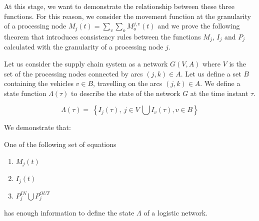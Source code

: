 At this stage, we want to demonstrate the relationship between these three functions. For this reason, we consider the movement function at the granularity of a processing node $M_j(t)=\sum_{v}\sum_{o}{M_o^{j,v}(t)}$  and we prove the following theorem that introduces consistency rules between the functions $M_j$, $I_j$ and $P_j$ calculated with the granularity of a processing node $j$. \par

Let us consider the supply chain system as a network $G(V,A)$ where $V$ is the set of the processing nodes connected by arcs $(j,k)\in A$. Let us define a set $B$ containing the vehicles $v\in B$, travelling on the arcs $(j,k)\in A$. We define a state function $\Lambda(\tau)$ to describe the state of the network $G$ at the time instant $\tau$.   


\begin{equation}
\Lambda\left(\tau\right)=\ \left\{I_j\left(\tau\right),\ j\in V\ \bigcup{I_v\left(\tau\right),v\in}B\right\}
\label{eq_stateLambda}
\end{equation}

We demonstrate that:

\begin{theorem} \label{theor_MIP}
One of the following set of equations 
\begin{enumerate}[label=(\roman*)]
    \item $M_j(t)$
    \item $I_j(t)$
    \item $P_j^{IN} \bigcup P_j^{OUT} $
\end{enumerate}
has enough information to define the state $\Lambda$ of a logistic network. 
\end{theorem}

